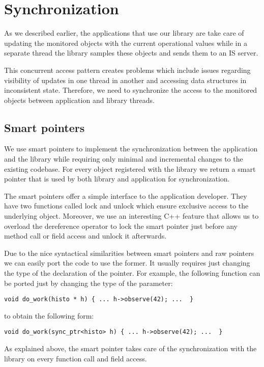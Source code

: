 \chapter{Synchronization} %
\label{Capitolul4}


As we described earlier, the applications that use our library are take care of updating the monitored objects with the current operational values while in a separate thread the library samples these objects and sends them to an IS server. 

This concurrent access pattern creates problems which include issues regarding visibility of updates in one thread in another and accessing data structures in inconsistent state. Therefore, we need to synchronize the access to the monitored objects between application and library 
threads.

\section*{Smart pointers}

We use smart pointers to implement the synchronization between the application and the library while requiring only minimal and incremental changes to the existing codebase. For every object registered with the library we return a smart pointer that is used by both library and application for synchronization. 

The smart pointers offer a simple interface to the application developer. They have two functions called lock and unlock which ensure exclusive access to the underlying object. Moreover, we use an interesting C++ feature \citep{andrei2001modern} that allows us to overload the dereference operator to lock the smart pointer just before any method call or field access and unlock it afterwards.

Due to the nice syntactical similarities between smart pointers and raw pointers we can easily port the code to use the former. It usually requires just changing the type of the declaration of the pointer. For example, the following function can be ported just by changing the type of the parameter:

\verb+void do_work(histo * h) { ... h->observe(42); ...  }+

to obtain the following form:

\verb+void do_work(sync_ptr<histo> h) { ... h->observe(42); ...  }+

As explained above, the smart pointer takes care of the synchronization with the library on every function call and field access.

